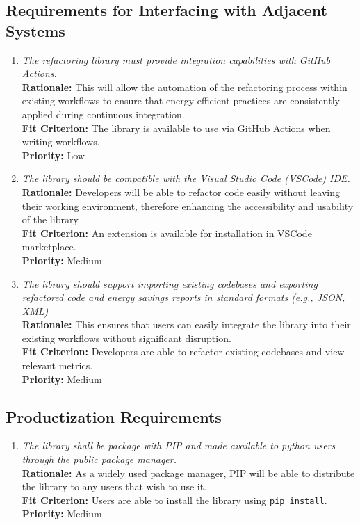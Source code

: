 \documentclass[12pt]{article}
\begin{document}
\subsection{Requirements for Interfacing with Adjacent Systems}
\begin{enumerate}[label=OER-IAS \arabic*., wide=0pt, leftmargin=*]
	\item \emph{The refactoring library must provide integration capabilities with GitHub Actions.}\\
    {\bf Rationale:} This will allow the automation of the refactoring process within existing workflows to ensure that energy-efficient practices are consistently applied during continuous integration.\\
    {\bf Fit Criterion:} The library is available to use via GitHub Actions when writing workflows.\\
    {\bf Priority:} Low
  \item \emph{The library should be compatible with the Visual Studio Code (VSCode) IDE.}\\
    {\bf Rationale:} Developers will be able to refactor code easily without leaving their working environment, therefore enhancing the accessibility and usability of the library.\\
    {\bf Fit Criterion:} An extension is available for installation in VSCode marketplace.\\
    {\bf Priority:} Medium
  \item \emph{The library should support importing existing codebases and exporting refactored code and energy savings reports in standard formats (e.g., JSON, XML)}\\
    {\bf Rationale:} This ensures that users can easily integrate the library into their existing workflows without significant disruption.\\
    {\bf Fit Criterion:} Developers are able to refactor existing codebases and view relevant metrics.\\
    {\bf Priority:} Medium
\end{enumerate}

\subsection{Productization Requirements}
\begin{enumerate}[label=OER-PR \arabic*., wide=0pt, leftmargin=*]
	\item \emph{The library shall be package with PIP and made available to python users through the public package manager.}\\
    {\bf Rationale:} As a widely used package manager, PIP will be able to distribute the library to any users that wish to use it.\\
    {\bf Fit Criterion:} Users are able to install the library using \texttt{pip install}. \\
    {\bf Priority:} Medium
\end{enumerate}
\end{document}
